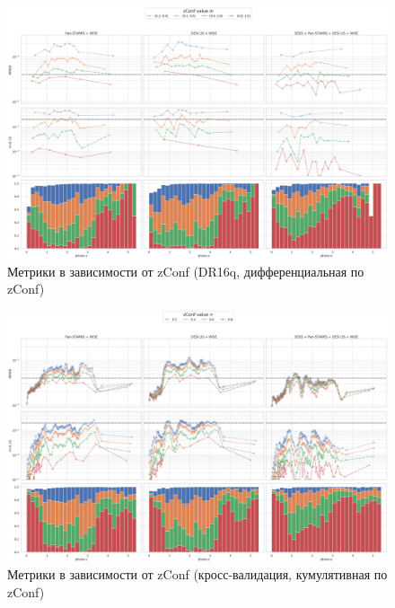 \documentclass[fleqn,usenatbib]{mnras}
\begin{document}
\begin{figure}
    \centering
    \includegraphics[width=0.99\linewidth]{images/metrics-zconf-dr16q-log.png}
    \caption{Метрики в зависимости от zConf (DR16q, дифференциальная по zConf)}
    \label{fig:metrics-zconf-cv2}
\end{figure}

\begin{figure}
    \centering
    \includegraphics[width=0.99\linewidth]{images/metrics-zconf-cv2-log-cum.png}
    \caption{Метрики в зависимости от zConf (кросс-валидация, кумулятивная по zConf)}
    \label{fig:metrics-zconf-cv2}
\end{figure}
\end{document}
